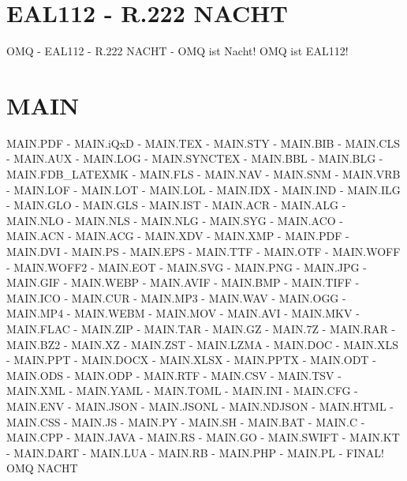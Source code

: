 \documentclass{MAIN}
\begin{document}
\maketitle
\section*{EAL112 - R.222 NACHT}
OMQ - EAL112 - R.222 NACHT - OMQ ist Nacht! OMQ ist EAL112!
\section*{MAIN}
MAIN.PDF - MAIN.iQxD - MAIN.TEX - MAIN.STY - MAIN.BIB - MAIN.CLS - MAIN.AUX - MAIN.LOG - MAIN.SYNCTEX - MAIN.BBL - MAIN.BLG - MAIN.FDB_LATEXMK - MAIN.FLS - MAIN.NAV - MAIN.SNM - MAIN.VRB - MAIN.LOF - MAIN.LOT - MAIN.LOL - MAIN.IDX - MAIN.IND - MAIN.ILG - MAIN.GLO - MAIN.GLS - MAIN.IST - MAIN.ACR - MAIN.ALG - MAIN.NLO - MAIN.NLS - MAIN.NLG - MAIN.SYG - MAIN.ACO - MAIN.ACN - MAIN.ACG - MAIN.XDV - MAIN.XMP - MAIN.PDF - MAIN.DVI - MAIN.PS - MAIN.EPS - MAIN.TTF - MAIN.OTF - MAIN.WOFF - MAIN.WOFF2 - MAIN.EOT - MAIN.SVG - MAIN.PNG - MAIN.JPG - MAIN.GIF - MAIN.WEBP - MAIN.AVIF - MAIN.BMP - MAIN.TIFF - MAIN.ICO - MAIN.CUR - MAIN.MP3 - MAIN.WAV - MAIN.OGG - MAIN.MP4 - MAIN.WEBM - MAIN.MOV - MAIN.AVI - MAIN.MKV - MAIN.FLAC - MAIN.ZIP - MAIN.TAR - MAIN.GZ - MAIN.7Z - MAIN.RAR - MAIN.BZ2 - MAIN.XZ - MAIN.ZST - MAIN.LZMA - MAIN.DOC - MAIN.XLS - MAIN.PPT - MAIN.DOCX - MAIN.XLSX - MAIN.PPTX - MAIN.ODT - MAIN.ODS - MAIN.ODP - MAIN.RTF - MAIN.CSV - MAIN.TSV - MAIN.XML - MAIN.YAML - MAIN.TOML - MAIN.INI - MAIN.CFG - MAIN.ENV - MAIN.JSON - MAIN.JSONL - MAIN.NDJSON - MAIN.HTML - MAIN.CSS - MAIN.JS - MAIN.PY - MAIN.SH - MAIN.BAT - MAIN.C - MAIN.CPP - MAIN.JAVA - MAIN.RS - MAIN.GO - MAIN.SWIFT - MAIN.KT - MAIN.DART - MAIN.LUA - MAIN.RB - MAIN.PHP - MAIN.PL - FINAL!
\cite{omq_eal112}
\ac{OMQ}
\ac{NACHT}

\printindex
\printglossary
\printnomenclature
\printacronyms
\end{document}

